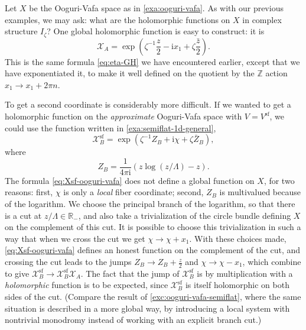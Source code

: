 \documentclass[12pt,letterpaper,reqno]{article}
\numberwithin{equation}{section}
\newcommand{\cX}{\ensuremath{\mathcal X}}
\newcommand{\R}{\ensuremath{\mathbb R}}
\newcommand{\Z}{\ensuremath{\mathbb Z}}
\newcommand{\I}{{\mathrm i}}
\renewcommand{\sf}{\mathrm{sf}}
\newcommand{\ti}[1]{\textit{#1}}
\begin{document}
\begin{example}
Let $X$ be the Ooguri-Vafa space as in \autoref{exa:ooguri-vafa}.
As with our previous examples, we may ask: what are the holomorphic
functions on $X$ in complex structure $I_\zeta$?
One global holomorphic function is easy to construct: it is
\begin{equation}
  \cX_A = \exp \left(\zeta^{-1} \frac{z}{2} - \I x_1 + \zeta \frac{\bar{z}}{2}\right).
\end{equation}
This is the same formula \eqref{eq:eta-GH} we have encountered
earlier, except that we have exponentiated it, to make it well defined
on the quotient by the $\Z$ action $x_1 \to x_1 + 2 \pi n$.

To get a second coordinate is considerably more difficult.
If we wanted to get a holomorphic function on the \ti{approximate}
Ooguri-Vafa space with $V = V^\sf$, 
we could use the function written 
in \autoref{exa:semiflat-1d-general},
\begin{equation} \label{eq:Xsf-ooguri-vafa}
  \cX_B^{\sf} = \exp \left(\zeta^{-1} Z_B + \I \chi + \zeta \bar{Z}_B \right),
\end{equation}
where
\begin{equation}
  Z_B = \frac{1}{4 \pi \I} (z \log (z/\Lambda) - z).
\end{equation}
The formula \eqref{eq:Xsf-ooguri-vafa} does not define a global
function on $X$, for two reasons: first, $\chi$ is only a \ti{local} fiber
coordinate; second, $Z_B$ is multivalued because of the logarithm.
We choose the principal branch of the logarithm, so that there
is a cut at $z / \Lambda \in \R_-$, and also take a trivialization
of the circle bundle defining $X$ on the complement of this cut.
It is possible to choose this trivialization in such a way that
when we cross the cut we get $\chi \to \chi + x_1$.
With these choices made, \eqref{eq:Xsf-ooguri-vafa} defines
an honest function on the complement of the cut, and crossing
the cut leads to the jumps $Z_B \to Z_B + \frac{z}{2}$ 
and $\chi \to \chi - x_1$,
which combine to give $\cX_B^\sf \to \cX_B^\sf \cX_A$.
The fact that the jump of $\cX_B^\sf$ is by multiplication with a
\ti{holomorphic} function is to be expected, since $\cX_B^\sf$
is itself holomorphic on both sides of the cut.
(Compare the result of \autoref{exc:ooguri-vafa-semiflat}, where
the same situation is described in a more global way, by introducing
a local system with nontrivial monodromy instead of working
with an explicit branch cut.)


\end{example}
\end{document}
